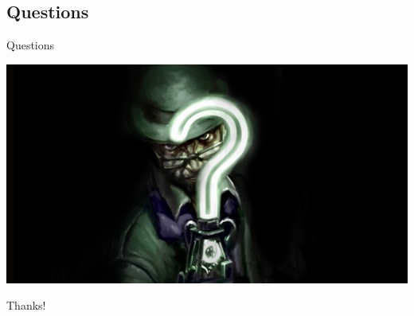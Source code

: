 \documentclass[utf8]{beamer}
\begin{document}
\subsection{Questions}
\begin{frame}{Questions}
	\begin{center}
		\includegraphics[width=\textwidth]{img/theriddler.jpg}
	\end{center}
\end{frame}

\appendix

\begin{frame}
	\begin{center}
		{\Huge Thanks!}
	\end{center}
\end{frame}
\end{document}
